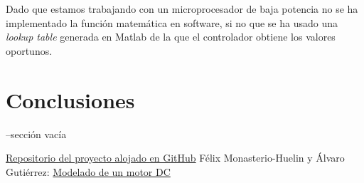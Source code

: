 \documentclass[a4paper]{article}
\begin{document}
Dado que estamos trabajando con un microprocesador de baja potencia no se ha implementado la función matemática en software, si no que se ha usado una \emph{lookup table} generada
en Matlab de la que el controlador obtiene los valores oportunos.

\section{Conclusiones}

--sección vacía



\begin{thebibliography}{99}
 \href{https://github.com/jjalberca/reallabo2018}{Repositorio del proyecto alojado en GitHub}
 Félix Monasterio-Huelin y Álvaro Gutiérrez: \href{http://robolabo.etsit.upm.es/asignaturas/seco/apuntes/modelado.pdf}{Modelado de un motor DC}
\end{thebibliography}
\end{document}
